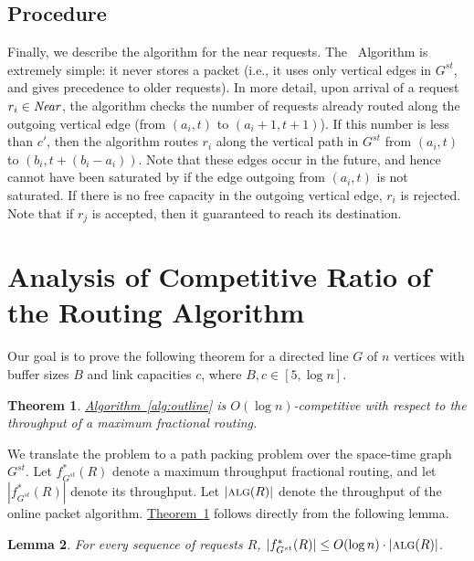 \documentclass[11pt]{article}
\newtheorem{theorem}{Theorem}
\newtheorem{lemma}[theorem]{Lemma}
\newcommand{\namedref}[2]{\hyperref[#2]{#1~\ref*{#2}}}
\newcommand{\theoremref}[1]{\namedref{Theorem}{#1}}
\newcommand{\Algref}[1]{\namedref{Algorithm}{#1}}
\newcommand{\routenear}{\text{\sc{route-near}}\xspace}
\newcommand{\alg}{\text{\sc{alg}}}
\newenvironment{proof sketch}[1]{\noindent {\emph{Proof sketch of #1:}}}{\hfill \qed}
\newcommand{\Gst}{G^{st}}
\newcommand{\near}{\text{\emph{Near}}\xspace}
\begin{document}
\subsection{Procedure \routenear}\label{sec:near}


Finally, we describe the algorithm for the near requests.  The
\routenear\ Algorithm is extremely simple: it never stores a packet
(i.e., it uses only vertical edges in $G^{st}$, and gives precedence
to older requests). In more detail, upon arrival of a request $r_i\in
\near$, the algorithm checks the number of requests already routed
along the outgoing vertical edge (from $(a_i,t)$ to $(a_i+1,t+1)$). If
this number is less than $c'$, then the algorithm routes $r_i$ along
the vertical path in $G^{st}$ from $(a_i,t)$ to
$(b_i,t+(b_i-a_i))$. Note that these edges occur in the future, and
hence cannot have been saturated by \routenear if the edge outgoing
from $(a_i,t)$ is not saturated.  If there is no free capacity in the
outgoing vertical edge, $r_i$ is rejected. Note that if $r_j$ is
accepted, then it guaranteed to reach its destination.


\section{Analysis of Competitive Ratio of the Routing Algorithm}
\label{sec:analysis}


Our goal is to prove the following theorem for a directed line $G$ of $n$ vertices with
buffer sizes $B$ and link capacities $c$, where $B,c\in[5,\log n]$.
\begin{theorem}\label{thm:main}
  \Algref{alg:outline} is $O(\log n)$-competitive with respect to the throughput of a
  maximum fractional routing.
\end{theorem}

We translate the problem to a path packing problem over the space-time graph $\Gst$.
Let $f^*_{\Gst}(R)$ denote a maximum throughput fractional  routing, and let
$|f^*_{\Gst}(R)|$ denote its throughput. Let $|\alg(R)|$ denote the throughput of the
online packet algorithm. \theoremref{thm:main} follows directly from the following
lemma.

\begin{lemma}\label{lemma:frac cr} For every sequence of requests $R$,
  $|f^*_{\Gst}(R)|\leq O(\log n) \cdot |\alg(R)|$.
\end{lemma}
\end{document}

